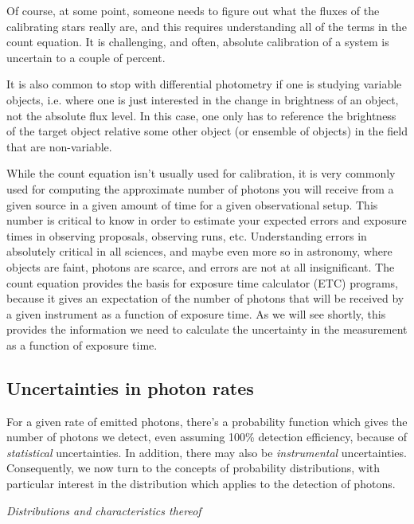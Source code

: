 \documentclass[12pt]{article}
\begin{document}
Of course, at some point, someone needs to figure out what
the fluxes of the calibrating stars really are, and this requires
understanding all of the terms in the count equation. It is
challenging, and often, absolute calibration of a system is uncertain
to a couple of percent.

It is also common to stop with differential photometry if
one is studying variable objects, i.e. where one is just interested in
the change in brightness of an object, not the absolute flux level. In
this case, one only has to reference the brightness of the target
object relative some other object (or ensemble of objects) in the
field that are non-variable.

While the count equation isn't usually used for calibration,
it is very commonly used for computing the approximate number of
photons you will receive from a given source in a given amount of time
for a given observational setup. This number is critical to know in
order to estimate your expected errors and exposure times in observing
proposals, observing runs, etc. Understanding errors in absolutely
critical in all sciences, and maybe even more so in astronomy, where
objects are faint, photons are scarce, and errors are not at all
insignificant. The count equation provides the basis for exposure time
calculator (ETC) programs, because it gives an expectation of the
number of photons that will be received by a given instrument as a
function of exposure time. As we will see shortly, this provides the
information we need to calculate the uncertainty in the measurement as
a function of exposure time.


\subsection*{Uncertainties in photon rates}
For a given rate of emitted photons, there's a probability function
which gives the number of photons we detect, even assuming 100\%
detection efficiency, because of \emph{statistical} uncertainties. In
addition, there may also be \emph{instrumental} uncertainties. Consequently,
we now turn to the concepts of probability distributions, with
particular interest in the distribution which applies to the detection
of photons.

\emph{Distributions and characteristics thereof}
\end{document}
